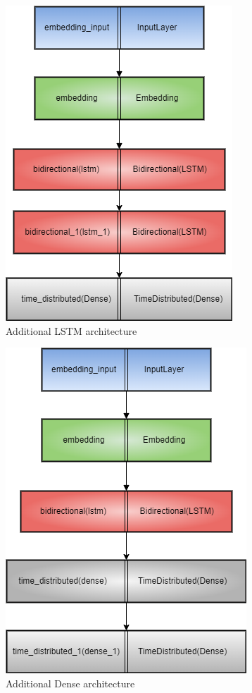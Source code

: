 \documentclass[11pt]{article}
\begin{document}
\begin{figure}[H]
        \centering
        \includegraphics[scale=0.41]{report/img/Additional_lstm.png}
        \caption{Additional LSTM architecture}
        \label{fig:lstm}
\end{figure}

\begin{figure}[H]
        \centering
        \includegraphics[scale=0.41]{img/Additional_dense.png}
        \caption{Additional Dense architecture}
        \label{fig:dense}
\end{figure}
\end{document}
